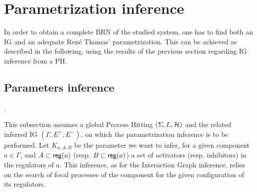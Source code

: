 \section{Parametrization inference}\label{sec:infer-K}


In order to obtain a complete BRN of the studied system, one has to find both an IG and an adequate René Thomas' parametrization. This can be achieved as described in the following, using the results of the previous section regarding IG inference from a PH.


\subsection{Parameters inference}
.

This subsection assumes a global Process Hitting $(\Sigma,L,\mathcal{H})$ and the related inferred IG $(\Gamma, E^+, E^-)$, on which the parametrization inference is to be performed.
Let $K_{a,A,B}$ be the parameter we want to infer, for a given component $a \in \Gamma$, and $A \subset \mathsf{reg}({a})$ (resp. $B \subset \mathsf{reg}({a})$)  a set of activators (resp. inhibitors) in the regulators of $a$.
This inference, as for the Interaction Graph inference, relies on the search of focal processes of the component for the given configuration of its regulators.

